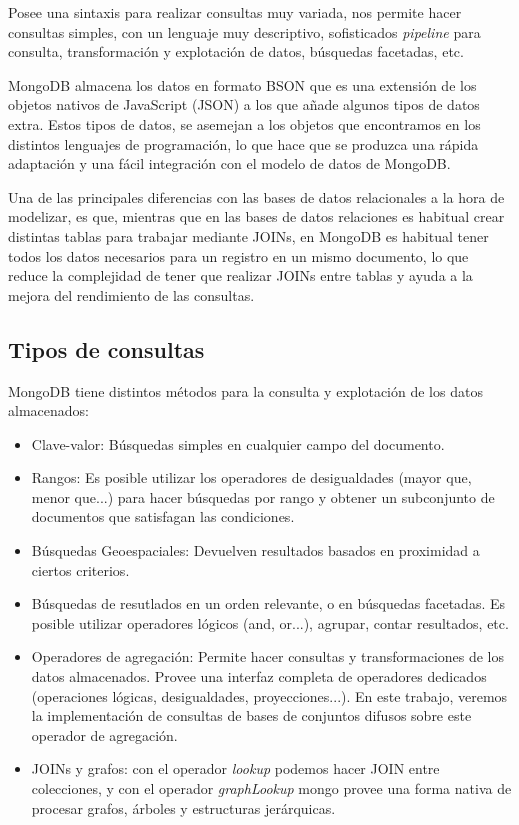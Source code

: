 Posee una sintaxis para realizar consultas muy variada, nos permite hacer consultas simples, con un lenguaje muy descriptivo, sofisticados \textit{pipeline} para consulta, transformación y explotación de datos, búsquedas facetadas, etc.

MongoDB almacena los datos en formato BSON \cite{bsonspec} que es una extensión de los objetos nativos de JavaScript (JSON) a los que añade algunos tipos de datos extra. Estos tipos de datos, se asemejan a los objetos que encontramos en los distintos lenguajes de programación, lo que hace que se produzca una rápida adaptación y una fácil integración con el modelo de datos de MongoDB.

Una de las principales diferencias con las bases de datos relacionales a la hora de modelizar, es que, mientras que en las bases de datos relaciones es habitual crear distintas tablas para trabajar mediante JOINs, en MongoDB es habitual tener todos los datos necesarios para un registro en un mismo documento, lo que reduce la complejidad de tener que realizar JOINs entre tablas y ayuda a la mejora del rendimiento de las consultas.

\subsection{Tipos de consultas}

MongoDB tiene distintos métodos para la consulta y explotación de los datos almacenados:

\begin{itemize}
    \item Clave-valor: Búsquedas simples en cualquier campo del documento.
    \item Rangos: Es posible utilizar los operadores de desigualdades (mayor que, menor que...) para hacer búsquedas por rango y obtener un subconjunto de documentos que satisfagan las condiciones.
    \item Búsquedas Geoespaciales: Devuelven resultados basados en proximidad a ciertos criterios.
    \item Búsquedas de resutlados en un orden relevante, o en búsquedas facetadas. Es posible utilizar operadores lógicos (and, or...), agrupar, contar resultados, etc.
    \item Operadores de agregación: Permite hacer consultas y transformaciones de los datos almacenados. Provee una interfaz completa de operadores dedicados (operaciones lógicas, desigualdades, proyecciones...). En este trabajo, veremos la implementación de consultas de bases de conjuntos difusos sobre este operador de agregación.
    \item JOINs y grafos: con el operador \textit{lookup} podemos hacer JOIN entre colecciones, y con el operador \textit{graphLookup} mongo provee una forma nativa de procesar grafos, árboles y estructuras jerárquicas.
\end{itemize}


